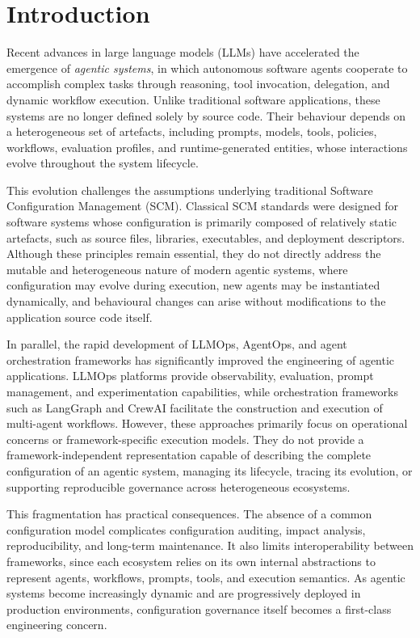 \documentclass[10pt]{article}
\begin{document}
\section{Introduction}

Recent advances in large language models (LLMs) have accelerated the emergence of \emph{agentic systems}, in which autonomous software agents cooperate to accomplish complex tasks through reasoning, tool invocation, delegation, and dynamic workflow execution. Unlike traditional software applications, these systems are no longer defined solely by source code. Their behaviour depends on a heterogeneous set of artefacts, including prompts, models, tools, policies, workflows, evaluation profiles, and runtime-generated entities, whose interactions evolve throughout the system lifecycle.

This evolution challenges the assumptions underlying traditional Software Configuration Management (SCM). Classical SCM standards were designed for software systems whose configuration is primarily composed of relatively static artefacts, such as source files, libraries, executables, and deployment descriptors. Although these principles remain essential, they do not directly address the mutable and heterogeneous nature of modern agentic systems, where configuration may evolve during execution, new agents may be instantiated dynamically, and behavioural changes can arise without modifications to the application source code itself.

In parallel, the rapid development of LLMOps, AgentOps, and agent orchestration frameworks has significantly improved the engineering of agentic applications. LLMOps platforms provide observability, evaluation, prompt management, and experimentation capabilities, while orchestration frameworks such as LangGraph and CrewAI facilitate the construction and execution of multi-agent workflows. However, these approaches primarily focus on operational concerns or framework-specific execution models. They do not provide a framework-independent representation capable of describing the complete configuration of an agentic system, managing its lifecycle, tracing its evolution, or supporting reproducible governance across heterogeneous ecosystems.

This fragmentation has practical consequences. The absence of a common configuration model complicates configuration auditing, impact analysis, reproducibility, and long-term maintenance. It also limits interoperability between frameworks, since each ecosystem relies on its own internal abstractions to represent agents, workflows, prompts, tools, and execution semantics. As agentic systems become increasingly dynamic and are progressively deployed in production environments, configuration governance itself becomes a first-class engineering concern.
\end{document}

